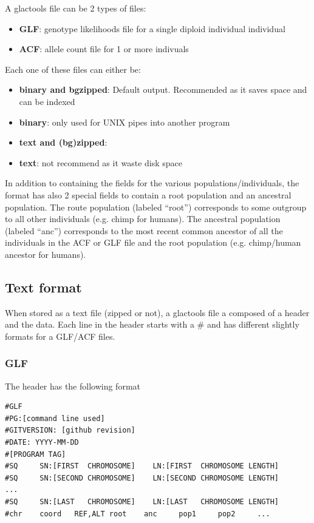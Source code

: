 \documentclass[a4paper]{article}
\begin{document}
\noindent  A glactools file can be 2 types of files:
\begin{itemize}
\item {\bf GLF}: genotype likelihoods file for a single diploid individual individual
\item {\bf ACF}: allele count file for 1 or more indivuals
\end{itemize}

\noindent  Each one of these files can either be:
\begin{itemize}
\item {\bf binary and bgzipped}: Default output. Recommended as it saves space and can be indexed
\item {\bf binary}:  only used for UNIX pipes into another program
\item {\bf text and (bg)zipped}: 
\item {\bf text}: not recommend as it waste disk space
\end{itemize}

\noindent In addition to containing the fields for the various populations/individuals, the format  has also 2 special fields to contain a root population and an ancestral population.  The route population (labeled  ``root'') corresponds to some outgroup to all other individuals (e.g. chimp for humans).  The ancestral population (labeled  ``anc'')  corresponds to the most recent common ancestor of all the individuals in the ACF or GLF file and the root population (e.g. chimp/human ancestor for humans).
\subsection{Text format}


When stored as a text file (zipped or not), a glactools file a composed of a header and the data. Each line in the header starts with a \# and has different slightly formats for a GLF/ACF files.

\subsubsection{GLF} 
\label{text:glf}
\noindent The header has the following format

\begin{lstlisting}
#GLF
#PG:[command line used]
#GITVERSION: [github revision]
#DATE: YYYY-MM-DD
#[PROGRAM TAG]
#SQ     SN:[FIRST  CHROMOSOME]    LN:[FIRST  CHROMOSOME LENGTH]
#SQ     SN:[SECOND CHROMOSOME]    LN:[SECOND CHROMOSOME LENGTH]
...
#SQ     SN:[LAST   CHROMOSOME]    LN:[LAST   CHROMOSOME LENGTH]
#chr    coord   REF,ALT root    anc     pop1     pop2     ...
\end{lstlisting}
\end{document}
